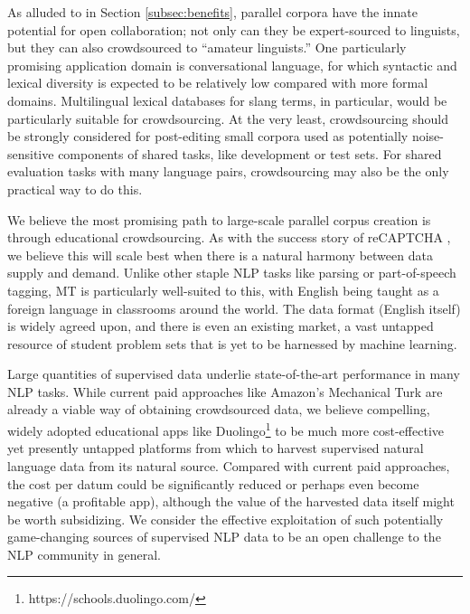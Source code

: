 As alluded to in Section \ref{subsec:benefits}, parallel corpora have the innate potential for open collaboration; not only can they be expert-sourced to linguists, but they can also crowdsourced to ``amateur linguists.''
One particularly promising application domain is conversational language, for which syntactic and lexical diversity is expected to be relatively low compared with more formal domains. 
Multilingual lexical databases for slang terms, in particular, would be particularly suitable for crowdsourcing.
At the very least, crowdsourcing should be strongly considered for post-editing small corpora used as potentially noise-sensitive components of shared tasks, like development or test sets.
For shared evaluation tasks with many language pairs, crowdsourcing may also be the only practical way to do this.

We believe the most promising path to large-scale parallel corpus creation is through educational crowdsourcing.
As with the success story of reCAPTCHA , we believe this will scale best when there is a natural harmony between data supply and demand.
Unlike other staple NLP tasks like parsing or part-of-speech tagging, MT is particularly well-suited to this, with English being taught as a foreign language in classrooms around the world.
The data format (English itself) is widely agreed upon, and there is even an existing market, a vast untapped resource of student problem sets that is yet to be harnessed by machine learning.

Large quantities of supervised data underlie state-of-the-art performance in many NLP tasks.
While current paid approaches like Amazon's Mechanical Turk are already a viable way of obtaining crowdsourced data, we believe 
compelling, widely adopted educational apps like Duolingo\footnote{https://schools.duolingo.com/} to be much more cost-effective yet presently untapped platforms from which to harvest supervised natural language data from its natural source. 
Compared with current paid approaches, the cost per datum could be significantly reduced or perhaps even become negative (a profitable app), although the value of the harvested data itself might be worth subsidizing.
We consider the effective exploitation of such potentially game-changing sources of supervised NLP data to be an open challenge to the NLP community in general.

